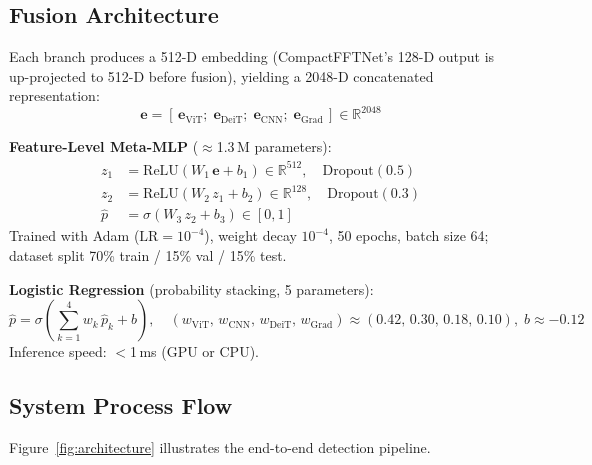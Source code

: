 \documentclass[12pt, a4paper]{article}
\begin{document}
\subsection{Fusion Architecture}
\label{sec:fusion}

Each branch produces a 512-D embedding (CompactFFTNet's 128-D output is
up-projected to 512-D before fusion), yielding a 2048-D concatenated
representation:
\begin{equation}
  \mathbf{e} = [\,\mathbf{e}_{\mathrm{ViT}};\;
                   \mathbf{e}_{\mathrm{DeiT}};\;
                   \mathbf{e}_{\mathrm{CNN}};\;
                   \mathbf{e}_{\mathrm{Grad}}\,]
               \in \mathbb{R}^{2048}
  \label{eq:concat}
\end{equation}

\noindent\textbf{Feature-Level Meta-MLP} ($\approx$1.3\,M parameters):
\begin{align}
  z_1 &= \mathrm{ReLU}(W_1\,\mathbf{e}+b_1)\in\mathbb{R}^{512},
         \quad\mathrm{Dropout}(0.5) \label{eq:mlp1}\\
  z_2 &= \mathrm{ReLU}(W_2\,z_1+b_2)\in\mathbb{R}^{128},
         \quad\mathrm{Dropout}(0.3) \label{eq:mlp2}\\
  \hat{p} &= \sigma(W_3\,z_2+b_3)\in[0,1] \label{eq:mlp3}
\end{align}
Trained with Adam ($\mathrm{LR}=10^{-4}$), weight decay $10^{-4}$, 50 epochs,
batch size 64; dataset split 70\% train / 15\% val / 15\% test.

\vspace{0.5em}
\noindent\textbf{Logistic Regression} (probability stacking, 5 parameters):
\begin{equation}
  \hat{p} = \sigma\!\left(\sum_{k=1}^{4} w_k\,\hat{p}_k + b\right),
  \quad (w_{\mathrm{ViT}},\,w_{\mathrm{CNN}},\,w_{\mathrm{DeiT}},\,w_{\mathrm{Grad}})
       \approx (0.42,\,0.30,\,0.18,\,0.10),\; b\approx{-0.12}
  \label{eq:logreg}
\end{equation}
Inference speed: $<$1\,ms (GPU or CPU).

\subsection{System Process Flow}
\label{sec:flow}

Figure~\ref{fig:architecture} illustrates the end-to-end detection pipeline.
\end{document}
